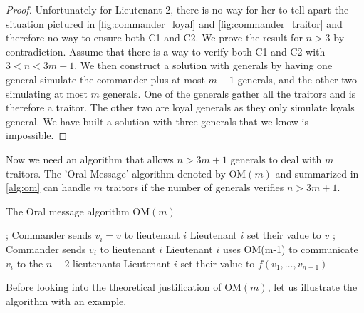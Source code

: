 \begin{proof}
Unfortunately for Lieutenant 2, there is no way for her to tell apart the situation pictured in \cref{fig:commander_loyal} and \cref{fig:commander_traitor} and therefore no way to ensure both C1 and C2. We prove the result for $n>3$ by contradiction. Assume that there is a way to verify both C1 and C2 with $3<n<3m+1$. We then construct a solution with generals by having one general simulate the commander plus at most $m-1$ generals, and the other two simulating at most $m$ generals. One of the generals gather all the traitors and is therefore a traitor. The other two are loyal generals as they only simulate loyals general. We have built a solution with three generals that we know is impossible. 
\end{proof}
Now we need an algorithm that allows $n>3m+1$ generals to deal with $m$ traitors. The 'Oral Message' algorithm denoted by $\text{OM}(m)$ and summarized in \cref{alg:om} can handle $m$ traitors if the number of generals verifies $n>3m+1$.
\begin{algorithm}[!ht]
\caption{The Oral message algorithm $\text{OM}(m)$}\label{alg:om}
\begin{algorithmic}[1]
;
\State Commander sends $v_i = v$ to lieutenant $i$ 
\State Lieutenant $i$ set their value to $v$
\EndFor
\EndIf
{};
\State Commander sends $v_i$ to lieutenant $i$ 
\State Lieutenant $i$ uses OM(m-1) to communicate $v_i$ to the $n-2$ lieutenants
\EndFor
{} 
\State Lieutenant $i$ set their value to $f(v_1, \ldots, v_{n-1})$
\EndFor
\EndIf
\end{algorithmic}
\end{algorithm}
Before looking into the theoretical justification of $\text{OM}(m)$, let us illustrate the algorithm with an example.
